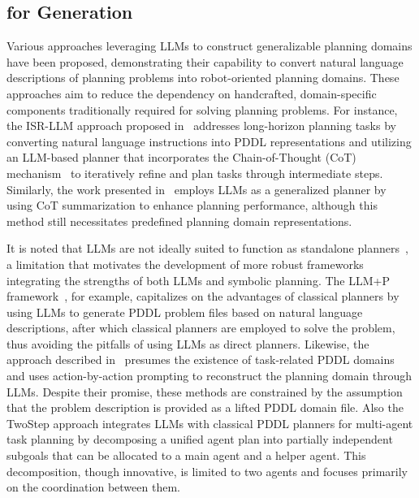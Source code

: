 \subsection{\llm for \kb Generation}
Various approaches leveraging LLMs to construct generalizable planning domains have been proposed, demonstrating their capability to convert natural language descriptions of planning problems into robot-oriented planning domains.
These approaches aim to reduce the dependency on handcrafted, domain-specific components traditionally required for solving planning problems. For instance, the ISR-LLM approach proposed in~\cite{10610065} addresses long-horizon planning tasks by converting natural language instructions into PDDL representations and utilizing an LLM-based planner that incorporates the Chain-of-Thought (CoT) mechanism~\cite{wei2022chain} to iteratively refine and plan tasks through intermediate steps. Similarly, the work presented in~\cite{Silver_Dan_Srinivas_Tenenbaum_Kaelbling_Katz_2024} employs LLMs as a generalized planner by using CoT summarization to enhance planning performance, although this method still necessitates predefined planning domain representations.

It is noted that LLMs are not ideally suited to function as standalone planners~\cite{valmeekam2022large}, a limitation that motivates the development of more robust frameworks integrating the strengths of both LLMs and symbolic planning. The LLM+P framework~\cite{liu2023llmp}, for example, capitalizes on the advantages of classical planners by using LLMs to generate PDDL problem files based on natural language descriptions, after which classical planners are employed to solve the problem, thus avoiding the pitfalls of using LLMs as direct planners. Likewise, the approach described in~\cite{oswald2024large} presumes the existence of task-related PDDL domains and uses action-by-action prompting to reconstruct the planning domain through LLMs. Despite their promise, these methods are constrained by the assumption that the problem description is provided as a lifted PDDL domain file.
Also the TwoStep approach \cite{singh2024twostepmultiagenttaskplanning} integrates LLMs with classical PDDL planners for multi-agent task planning by decomposing a unified agent plan into partially independent subgoals that can be allocated to a main agent and a helper agent. This decomposition, though innovative, is limited to two agents and focuses primarily on the coordination between them. 

